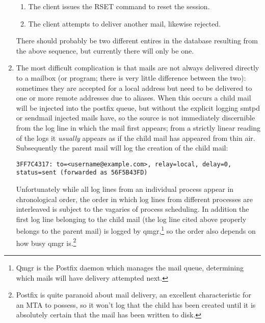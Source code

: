 \documentclass[a4paper,12pt,draft]{article}
\begin{document}
\begin{enumerate}
\begin{enumerate}
            \item The client issues the RSET command to reset the session.

            \item The client attempts to deliver another mail, likewise
                rejected.

        \end{enumerate}

        There should probably be two different entires in the database
        resulting from the above sequence, but currently there will only be
        one.

    \item The most difficult complication is that mails are not always
        delivered directly to a mailbox (or program; there is very little
        difference between the two): sometimes they are accepted for a
        local address but need to be delivered to one or more remote
        addresses due to aliases.  When this occurs a child mail will be
        injected into the postfix queue, but without the explicit logging
        smtpd or sendmail injected mails have, so the source is not
        immediately discernible from the log line in which the mail first
        appears; from a strictly linear reading of the logs it
        \textit{usually\/} appears as if the child mail has appeared from
        thin air.  Subsequently the parent mail will log the creation of
        the child mail:

        \texttt{3FF7C4317: to=<username@example.com>, relay=local, \newline 
        delay=0, status=sent (forwarded as 56F5B43FD)}

        Unfortunately while all log lines from an individual process appear
        in chronological order, the order in which log lines from different
        processes are interleaved is subject to the vagaries of process
        scheduling.  In addition the first log line belonging to the child
        mail (the log line cited above properly belongs to the parent mail)
        is logged by qmgr,\footnote{Qmgr is the Postfix daemon which
        manages the mail queue, determining which mails will have delivery
        attempted next.} so the order also depends on how busy qmgr
        is.\footnote{Postfix is quite paranoid about mail delivery, an
        excellent characteristic for an MTA to possess, so it won't log
        that the child has been created until it is absolutely certain that
        the mail has been written to disk.}


\end{enumerate}
\end{document}
